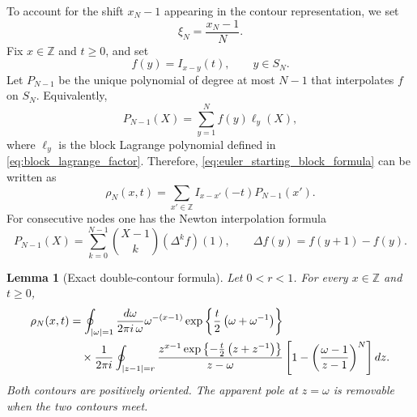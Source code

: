 \documentclass[11pt]{article}
\numberwithin{equation}{section}
\newtheorem{lemma}[theorem]{Lemma}
\newcommand{\Z}{\mathbb Z}
\newcommand{\1}{\mathbf 1}
\begin{document}
To account for the shift \(x_N-1\) appearing in the contour representation,
we set
\[
    \xi_N=\frac{x_N-1}{N}.
\]
Fix \(x\in\Z\) and \(t\ge0\), and set
\[
    f(y)=I_{x-y}(t),
    \qquad y\in S_N.
\]
Let \(P_{N-1}\) be the unique polynomial of degree at most \(N-1\) that
interpolates \(f\) on \(S_N\). Equivalently,
\[
    P_{N-1}(X)
    =
    \sum_{y=1}^N f(y)\ell_y(X),
\]
where \(\ell_y\) is the block Lagrange polynomial defined in
\eqref{eq:block_lagrange_factor}. Therefore,
\eqref{eq:euler_starting_block_formula} can be written as
\begin{equation}
    \rho_N(x,t)
    =
    \sum_{x'\in\Z} I_{x-x'}(-t) P_{N-1}(x').
    \label{eq:euler_density_interpolation_form}
\end{equation}
For consecutive nodes one has the Newton interpolation formula
\begin{equation}
    P_{N-1}(X)
    =
    \sum_{k=0}^{N-1}
    \binom{X-1}{k} (\Delta^k f)(1),
    \qquad
    \Delta f(y)=f(y+1)-f(y).
    \label{eq:euler_newton_interpolation}
\end{equation}

\begin{lemma}[Exact double-contour formula]
\label{lem:euler_exact_double_contour}
Let \(0<r<1\).  For every \(x\in\Z\) and \(t\ge0\),
\begin{align}
    \rho_N(x,t)
    & =
    \oint_{|\omega|=1}
    \frac{d\omega}{2\pi i\,\omega}
    \omega^{-(x-1)}
    \exp\left\{\frac{t}{2}\left(\omega+\omega^{-1}\right)\right\}
    \notag \\
    &\quad\times
    \frac{1}{2\pi i}
    \oint_{|z-1|=r}
    \frac{
        z^{x-1}
        \exp\left\{-\frac{t}{2}\left(z+z^{-1}\right)\right\}
    }{z-\omega}
    \left[
        1-
        \left(\frac{\omega-1}{z-1}\right)^N
    \right]dz .
    \label{eq:euler_exact_double_contour}
\end{align}
Both contours are positively oriented.  The apparent pole at \(z=\omega\) is
removable when the two contours meet.
\end{lemma}
\end{document}
